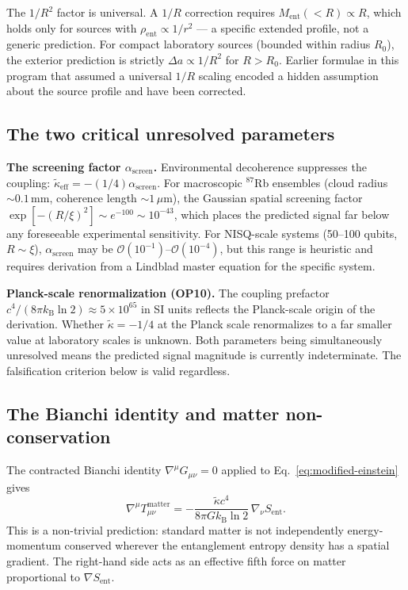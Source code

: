 \documentclass[12pt,twocolumn]{article}
\newcommand{\kB}{k_{\mathrm{B}}}
\newcommand{\kt}{\tilde{\kappa}}
\newcommand{\Sent}{S_{\mathrm{ent}}}
\newcommand{\Ment}{M_{\mathrm{ent}}}
\newcommand{\asc}{\alpha_{\mathrm{screen}}}
\begin{document}
The $1/R^2$ factor is universal.  A $1/R$ correction requires $\Ment(<\!R)\propto R$,
which holds only for sources with $\rho_{\mathrm{ent}}\propto 1/r^2$ --- a specific extended
profile, not a generic prediction.  For compact laboratory sources (bounded within radius
$R_0$), the exterior prediction is strictly $\Delta a \propto 1/R^2$ for $R > R_0$.
Earlier formulae in this program that assumed a universal $1/R$ scaling encoded a hidden
assumption about the source profile and have been corrected.

\subsection{The two critical unresolved parameters}

\textbf{The screening factor $\asc$.}  Environmental decoherence suppresses the coupling:
$\kt_{\mathrm{eff}} = -(1/4)\asc$.  For macroscopic $^{87}$Rb ensembles
(cloud radius $\sim\!0.1$\,mm, coherence length $\sim\!1\,\mu$m), the Gaussian spatial
screening factor $\exp[-(R/\xi)^2]\sim e^{-100}\sim 10^{-43}$, which places the predicted
signal far below any foreseeable experimental sensitivity.
For NISQ-scale systems (50--100 qubits, $R\sim\xi$), $\asc$ may be
$\mathcal{O}(10^{-1})$--$\mathcal{O}(10^{-4})$, but this range is heuristic and requires
derivation from a Lindblad master equation for the specific system.

\textbf{Planck-scale renormalization (OP10).}  The coupling prefactor
$c^4/(8\pi\kB\ln 2)\approx 5\times10^{65}$ in SI units reflects the Planck-scale origin of
the derivation.  Whether $\kt = -1/4$ at the Planck scale renormalizes to a far smaller value
at laboratory scales is unknown.  Both parameters being simultaneously unresolved means the
predicted signal magnitude is currently indeterminate.  The falsification criterion below is
valid regardless.

\subsection{The Bianchi identity and matter non-conservation}

The contracted Bianchi identity $\nabla^\mu G_{\mu\nu} = 0$ applied to
Eq.~\eqref{eq:modified-einstein} gives
\begin{equation}
  \nabla^\mu T_{\mu\nu}^{\mathrm{matter}}
  = -\frac{\kt c^4}{8\pi G\kB\ln 2}\,\nabla_\nu\Sent.
  \label{eq:bianchi}
\end{equation}
This is a non-trivial prediction: standard matter is not independently energy-momentum
conserved wherever the entanglement entropy density has a spatial gradient.  The right-hand
side acts as an effective fifth force on matter proportional to $\nabla\Sent$.
\end{document}
